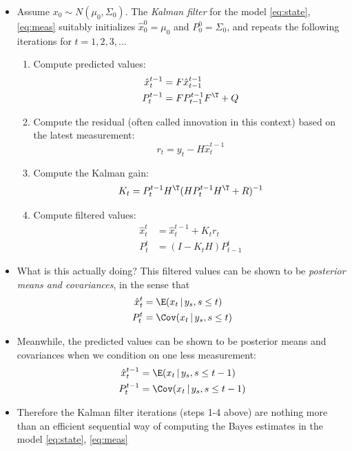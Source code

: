 \documentclass{article}
\begin{document}
\begin{itemize}
\item Assume $x_0 \sim N(\mu_0, \Sigma_0)$. The \emph{Kalman filter} for the
  model \eqref{eq:state}, \eqref{eq:meas} suitably initializes $\hat{x}_0^0 =
  \mu_0$ and $P_0^0 = \Sigma_0$, and repeats the following iterations for $t =
  1,2,3,\dots$    

\begin{enumerate}
\item Compute predicted values: 
  \begin{align}
  \label{eq:predict_x}
  \hat{x}_t^{t-1} &= F \hat{x}_{t-1}^{t-1} \\
  \label{eq:predict_p}
  P_t^{t-1} &= F P_{t-1}^{t-1} F^\T + Q
  \end{align}
  
\item Compute the residual (often called innovation in this context) based on
  the latest measurement:  
  \[
  r_t = y_t - H \hat{x}_t^{t-1} 
  \]

\item Compute the Kalman gain:
  \[
  K_t = P_t^{t-1} H^\T (H P_t^{t-1} H^\T + R)^{-1} 
  \]

\item Compute filtered values: 
  \begin{align}
  \label{eq:filter_x}
  \hat{x}_t^t &= \hat{x}_t^{t-1} + K_t r_t \\
  \label{eq:filter_p}
  P_t^t &= (I - K_t H) P_{t-1}^t
  \end{align}
\end{enumerate}
  
\item What is this actually doing? This filtered values can be shown to be
  \emph{posterior means and covariances}, in the sense that
  \begin{align*}
  \hat{x}_t^t &= \E( x_t \,|\, y_s, s \leq t ) \\
  P_t^t &= \Cov( x_t \,|\, y_s, s \leq t ) 
  \end{align*}

\item Meanwhile, the predicted values can be shown to be posterior means and
  covariances when we condition on one less measurement: 
  \begin{align*}
  \hat{x}_t^{t-1} &= \E( x_t \,|\, y_s, s \leq t-1 ) \\
  P_t^{t-1} &= \Cov( x_t \,|\, y_s, s \leq t-1 ) 
  \end{align*}

\item Therefore the Kalman filter iterations (steps 1-4 above) are nothing more
  than an efficient sequential way of computing the Bayes estimates in the model
  \eqref{eq:state}, \eqref{eq:meas} 
\end{itemize}
\end{document}

